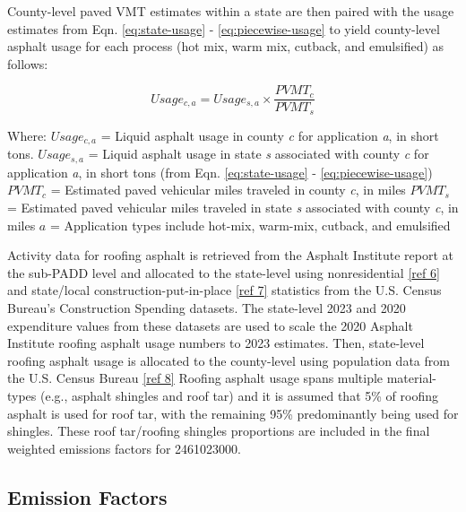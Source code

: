 \documentclass[
  11pt,
  oneside]{book}
\begin{document}
County-level paved VMT estimates within a state are then paired with the usage estimates from Eqn. \eqref{eq:state-usage} - \eqref{eq:piecewise-usage} to yield county-level asphalt usage for each process (hot mix, warm mix, cutback, and emulsified) as follows:

\begin{equation} 
  Usage_{c,a} = Usage_{s,a} \times \frac{PVMT_{c}}{PVMT_{s}}
  \label{eq:county-usage}
\end{equation}

Where: \newline
\(Usage_{c,a}\) = Liquid asphalt usage in county \emph{c} for application \emph{a}, in short tons. \newline
\(Usage_{s,a}\) = Liquid asphalt usage in state \emph{s} associated with county \emph{c} for application \emph{a}, in short tons (from Eqn. \eqref{eq:state-usage} - \eqref{eq:piecewise-usage}) \newline
\(PVMT_{c}\) = Estimated paved vehicular miles traveled in county \emph{c}, in miles \newline
\(PVMT_{s}\) = Estimated paved vehicular miles traveled in state \emph{s} associated with county \emph{c}, in miles \newline
\(a\) = Application types include hot-mix, warm-mix, cutback, and emulsified \newline

Activity data for roofing asphalt is retrieved from the Asphalt Institute report at the sub-PADD level and allocated to the state-level using nonresidential \hyperref[asphalt-references]{{[}ref 6{]}} and state/local construction-put-in-place \hyperref[asphalt-references]{{[}ref 7{]}} statistics from the U.S. Census Bureau's Construction Spending datasets. The state-level 2023 and 2020 expenditure values from these datasets are used to scale the 2020 Asphalt Institute roofing asphalt usage numbers to 2023 estimates. Then, state-level roofing asphalt usage is allocated to the county-level using population data from the U.S. Census Bureau \hyperref[asphalt-references]{{[}ref 8{]}} Roofing asphalt usage spans multiple material-types (e.g., asphalt shingles and roof tar) and it is assumed that 5\% of roofing asphalt is used for roof tar, with the remaining 95\% predominantly being used for shingles. These roof tar/roofing shingles proportions are included in the final weighted emissions factors for 2461023000.

\subsection{Emission Factors}\label{emission-factors-1}
\end{document}
